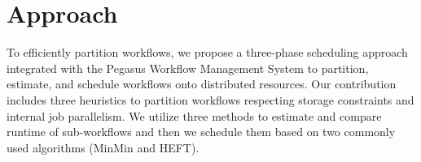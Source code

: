 

\section{Approach}

To efficiently partition workflows, we propose a three-phase scheduling approach integrated with the Pegasus Workflow Management System to partition, estimate, and schedule workflows onto distributed resources. Our contribution includes three heuristics to partition workflows respecting storage constraints and internal job parallelism. We utilize three methods to estimate and compare runtime of sub-workflows and then we schedule them based on two commonly used algorithms (MinMin and HEFT).  

